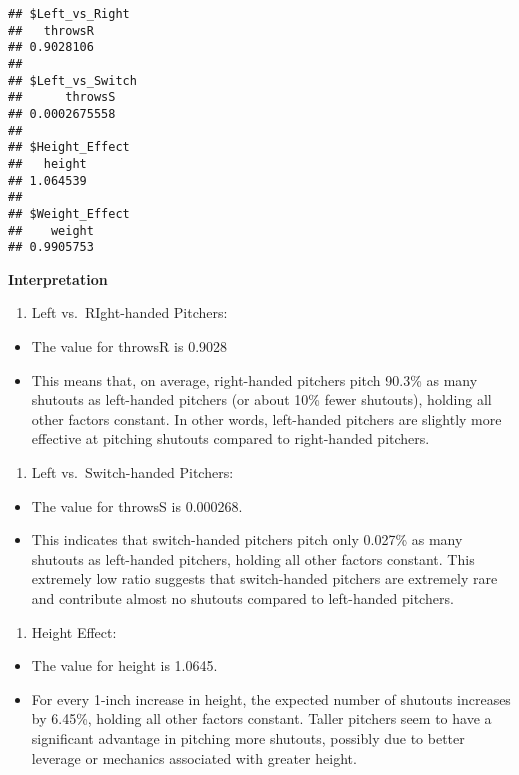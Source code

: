 \documentclass[
]{article}
\providecommand{\tightlist}{%
  \setlength{\itemsep}{0pt}\setlength{\parskip}{0pt}}
\begin{document}
\begin{verbatim}
## $Left_vs_Right
##   throwsR 
## 0.9028106 
## 
## $Left_vs_Switch
##      throwsS 
## 0.0002675558 
## 
## $Height_Effect
##   height 
## 1.064539 
## 
## $Weight_Effect
##    weight 
## 0.9905753
\end{verbatim}

\textbf{Interpretation}

\begin{enumerate}
\def\labelenumi{\arabic{enumi}.}
\tightlist
\item
  Left vs.~RIght-handed Pitchers:
\end{enumerate}

\begin{itemize}
\item
  The value for throwsR is 0.9028
\item
  This means that, on average, right-handed pitchers pitch 90.3\% as
  many shutouts as left-handed pitchers (or about 10\% fewer shutouts),
  holding all other factors constant. In other words, left-handed
  pitchers are slightly more effective at pitching shutouts compared to
  right-handed pitchers.
\end{itemize}

\begin{enumerate}
\def\labelenumi{\arabic{enumi}.}
\setcounter{enumi}{1}
\tightlist
\item
  Left vs.~Switch-handed Pitchers:
\end{enumerate}

\begin{itemize}
\item
  The value for throwsS is 0.000268.
\item
  This indicates that switch-handed pitchers pitch only 0.027\% as many
  shutouts as left-handed pitchers, holding all other factors constant.
  This extremely low ratio suggests that switch-handed pitchers are
  extremely rare and contribute almost no shutouts compared to
  left-handed pitchers.
\end{itemize}

\begin{enumerate}
\def\labelenumi{\arabic{enumi}.}
\setcounter{enumi}{2}
\tightlist
\item
  Height Effect:
\end{enumerate}

\begin{itemize}
\item
  The value for height is 1.0645.
\item
  For every 1-inch increase in height, the expected number of shutouts
  increases by 6.45\%, holding all other factors constant. Taller
  pitchers seem to have a significant advantage in pitching more
  shutouts, possibly due to better leverage or mechanics associated with
  greater height.
\end{itemize}
\end{document}
